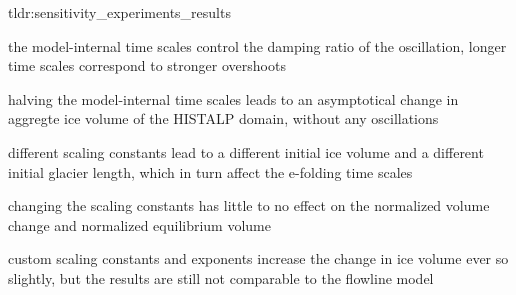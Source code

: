   \begin{tldrbox}{tldr:sensitivity_experiments_results}
    \item the model-internal time scales control the damping ratio of the oscillation, longer time scales correspond to stronger overshoots
    \item halving the model-internal time scales leads to an asymptotical change in aggregte ice volume of the HISTALP domain, without any oscillations
    \item different scaling constants lead to a different initial ice volume and a different initial glacier length, which in turn affect the e-folding time scales
    \item changing the scaling constants has little to no effect on the normalized volume change and normalized equilibrium volume
    \item custom scaling constants and exponents increase the change in ice volume ever so slightly, but the results are still not comparable to the flowline model
  \end{tldrbox}
  
